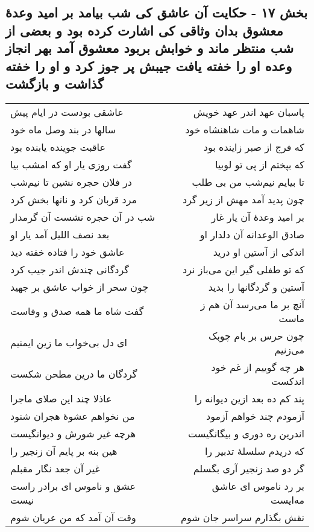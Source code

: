 \begin{center}
\section*{بخش ۱۷ - حکایت آن عاشق کی شب بیامد بر امید وعدهٔ معشوق بدان وثاقی کی اشارت کرده بود و بعضی از شب منتظر ماند و خوابش بربود معشوق آمد بهر انجاز وعده او را خفته یافت جیبش پر جوز کرد و او را خفته گذاشت و بازگشت}
\label{sec:sh017}
\begin{longtable}{l p{0.5cm} r}
عاشقی بودست در ایام پیش
&&
پاسبان عهد اندر عهد خویش
\\
سالها در بند وصل ماه خود
&&
شاهمات و مات شاهنشاه خود
\\
عاقبت جوینده یابنده بود
&&
که فرج از صبر زاینده بود
\\
گفت روزی یار او که امشب بیا
&&
که بپختم از پی تو لوبیا
\\
در فلان حجره نشین تا نیم‌شب
&&
تا بیایم نیم‌شب من بی طلب
\\
مرد قربان کرد و نانها بخش کرد
&&
چون پدید آمد مهش از زیر گرد
\\
شب در آن حجره نشست آن گرمدار
&&
بر امید وعدهٔ آن یار غار
\\
بعد نصف اللیل آمد یار او
&&
صادق الوعدانه آن دلدار او
\\
عاشق خود را فتاده خفته دید
&&
اندکی از آستین او درید
\\
گردگانی چندش اندر جیب کرد
&&
که تو طفلی گیر این می‌باز نرد
\\
چون سحر از خواب عاشق بر جهید
&&
آستین و گردگانها را بدید
\\
گفت شاه ما همه صدق و وفاست
&&
آنچ بر ما می‌رسد آن هم ز ماست
\\
ای دل بی‌خواب ما زین ایمنیم
&&
چون حرس بر بام چوبک می‌زنیم
\\
گردگان ما درین مطحن شکست
&&
هر چه گوییم از غم خود اندکست
\\
عاذلا چند این صلای ماجرا
&&
پند کم ده بعد ازین دیوانه را
\\
من نخواهم عشوهٔ هجران شنود
&&
آزمودم چند خواهم آزمود
\\
هرچه غیر شورش و دیوانگیست
&&
اندرین ره دوری و بیگانگیست
\\
هین بنه بر پایم آن زنجیر را
&&
که دریدم سلسلهٔ تدبیر را
\\
غیر آن جعد نگار مقبلم
&&
گر دو صد زنجیر آری بگسلم
\\
عشق و ناموس ای برادر راست نیست
&&
بر رد ناموس ای عاشق مه‌ایست
\\
وقت آن آمد که من عریان شوم
&&
نقش بگذارم سراسر جان شوم

\end{longtable}
\end{center}
